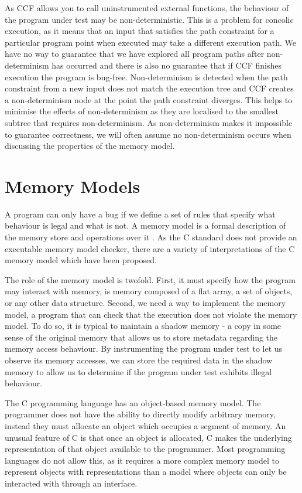 \documentclass[12pt,twoside]{report}
\begin{document}
As CCF allows you to call uninstrumented external functions, the behaviour of the program under test may be non-deterministic. This is a problem for concolic execution, as it means that an input that satisfies the path constraint for a particular program point when executed may take a different execution path. We have no way to guarantee that we have explored all program paths after non-determinism has occurred and there is also no guarantee that if CCF finishes execution the program is bug-free. Non-determinism is detected when the path constraint from a new input does not match the execution tree and CCF creates a non-determinism node at the point the path constraint diverges. This helps to minimise the effects of non-determinism as they are localised to the smallest subtree that requires non-determinism. As non-determinism makes it impossible to guarantee correctness, we will often assume no non-determinism occurs when discussing the properties of the memory model.

\section{Memory Models}
A program can only have a bug if we define a set of rules that specify what behaviour is legal and what is not. A memory model is a formal description of the memory store and operations over it \cite{leroy2008formal}. As the C standard does not provide an executable memory model checker, there are a variety of interpretations of the C memory model which have been proposed.

The role of the memory model is twofold. First, it must specify how the program may interact with memory, is memory composed of a flat array, a set of objects, or any other data structure. Second, we need a way to implement the memory model, a program that can check that the execution does not violate the memory model. To do so, it is typical to maintain a shadow memory - a copy in some sense of the original memory that allows us to store metadata regarding the memory access behaviour. By instrumenting the program under test to let us observe its memory accesses, we can store the required data in the shadow memory to allow us to determine if the program under test exhibits illegal behaviour.

The C programming language has an object-based memory model. The programmer does not have the ability to directly modify arbitrary memory, instead they must allocate an object which occupies a segment of memory. An unusual feature of C is that once an object is allocated, C makes the underlying representation of that object available to the programmer. Most programming languages do not allow this, as it requires a more complex memory model to represent objects with representations than a model where objects can only be interacted with through an interface.
\end{document}
